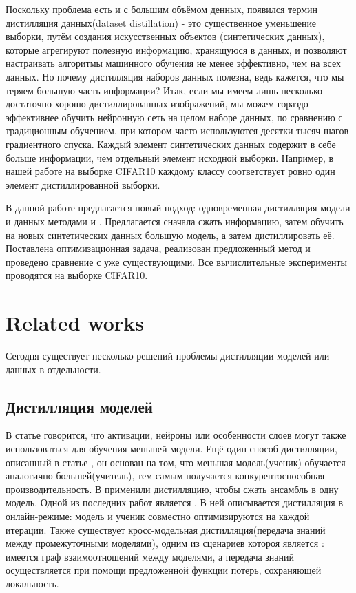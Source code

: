 \documentclass[12pt]{article}
\begin{document}
Поскольку проблема есть и с большим объёмом денных, появился термин дистилляция данных(dataset distillation) - это существенное уменьшение выборки, путём создания искусственных объектов (синтетических данных), которые агрегируют полезную информацию, хранящуюся в данных, и позволяют настраивать алгоритмы машинного обучения не менее эффективно, чем на всех данных. Но почему дистилляция наборов данных полезна, ведь кажется, что мы теряем большую часть информации? Итак, если мы имеем лишь несколько достаточно хорошо дистиллированных изображений, мы можем гораздо эффективнее обучить нейронную сеть на целом наборе данных,
по сравнению с традиционным обучением, при котором часто используются десятки тысяч шагов градиентного спуска. Каждый элемент синтетических данных содержит в себе больше информации, чем отдельный элемент исходной выборки. Например, в нашей работе на выборке CIFAR10 каждому классу соответствует ровно один элемент дистиллированной выборки.

В данной работе предлагается новый подход: одновременная дистилляция модели и данных методами \cite{hinton2015distilling} и \cite{cazenavette2022dataset}. Предлагается сначала сжать информацию, затем обучить на новых синтетических данных большую модель, а затем дистиллировать её. Поставлена оптимизационная задача, реализован предложенный метод и проведено сравнение с уже существующими. Все вычислительные эксперименты проводятся на выборке CIFAR10. 

\section{Related works}

 Сегодня существует несколько решений проблемы дистилляции моделей или данных в отдельности. 

\subsection{Дистилляция моделей}
В статье \cite{romero2014fitnets} говорится, что активации, нейроны или особенности слоев могут также использоваться для обучения меньшей модели. Ещё один способ дистилляции, описанный в статье \cite{ba2014deep}, он основан на том, что меньшая модель(ученик) обучается аналогично большей(учитель), тем самым получается конкурентоспособная производительность. В \cite{hinton2015distilling} применили дистилляцию, чтобы сжать ансамбль в одну модель. Одной из последних работ является \cite{chung2020feature}. В ней описывается дистилляция в онлайн-режиме: модель и ученик совместно оптимизируются на каждой итерации. Также существует кросс-модельная дистилляция(передача знаний между промежуточными моделями), одним из сценариев котороя является \cite{chen2021learning}: имеется граф взаимоотношений между моделями, а передача знаний осуществляется при помощи предложенной функции потерь, сохраняющей локальность.
\end{document}
